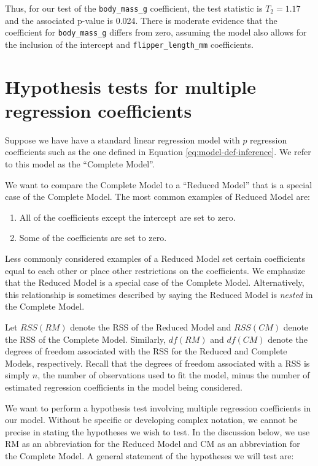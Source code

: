 \documentclass[
]{book}
\providecommand{\tightlist}{%
  \setlength{\itemsep}{0pt}\setlength{\parskip}{0pt}}
\theoremstyle{definition}
\theoremstyle{definition}
\theoremstyle{definition}
\theoremstyle{definition}
\theoremstyle{remark}
\begin{document}
Thus, for our test of the \texttt{body\_mass\_g} coefficient, the test statistic is \(T_2 = 1.17\) and the associated p-value is 0.024. There is moderate evidence that the coefficient for \texttt{body\_mass\_g} differs from zero, assuming the model also allows for the inclusion of the intercept and \texttt{flipper\_length\_mm} coefficients.

\hypertarget{hypothesis-tests-for-multiple-regression-coefficients}{%
\section{Hypothesis tests for multiple regression coefficients}\label{hypothesis-tests-for-multiple-regression-coefficients}}

Suppose we have have a standard linear regression model with
\(p\) regression coefficients such as the one defined in Equation \eqref{eq:model-def-inference}. We refer to this model as the ``Complete Model''.

We want to compare the Complete Model to a ``Reduced Model'' that is a special case of the Complete Model. The most common examples of Reduced Model are:

\begin{enumerate}
\def\labelenumi{\arabic{enumi}.}
\tightlist
\item
  All of the coefficients except the intercept are set to zero.
\item
  Some of the coefficients are set to zero.
\end{enumerate}

Less commonly considered examples of a Reduced Model set certain coefficients equal to each other or place other restrictions on the coefficients. We emphasize that the Reduced Model is a special case of the Complete Model. Alternatively, this relationship is sometimes described by saying the Reduced Model is \emph{nested} in the Complete Model.

Let \(RSS(RM)\) denote the RSS of the Reduced Model and \(RSS(CM)\) denote the RSS of the Complete Model. Similarly, \(df(RM)\) and \(df(CM)\) denote the degrees of freedom associated with the RSS for the Reduced and Complete Models, respectively. Recall that the degrees of freedom associated with a RSS is simply \(n\), the number of observations used to fit the model, minus the number of estimated regression coefficients in the model being considered.

We want to perform a hypothesis test involving multiple regression coefficients in our model. Without be specific or developing complex notation, we cannot be precise in stating the hypotheses we wish to test. In the discussion below, we use RM as an abbreviation for the Reduced Model and CM as an abbreviation for the Complete Model. A general statement of the hypotheses we will test are:
\end{document}
